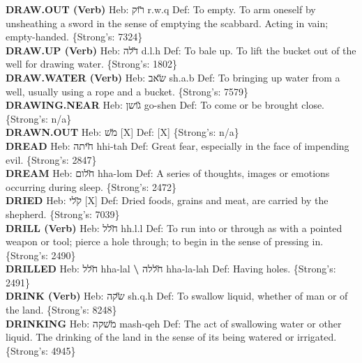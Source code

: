{\textbf{DRAW.OUT (Verb)} Heb: {\large\H רוק} r.w.q Def: To empty. To arm oneself by unsheathing a sword in the sense of emptying the scabbard. Acting in vain; empty-handed. \{Strong's: 7324\}\hfill{}\\

\textbf{DRAW.UP (Verb)} Heb: {\large\H דלה} d.l.h Def: To bale up. To lift the bucket out of the well for drawing water. \{Strong's: 1802\}\hfill{}\\

\textbf{DRAW.WATER (Verb)} Heb: {\large\H שאב} sh.a.b Def: To bringing up water from a well, usually using a rope and a bucket. \{Strong's: 7579\}\hfill{}\\

\textbf{DRAWING.NEAR} Heb: {\large\H גושן} go-shen Def: To come or be brought close. \{Strong's: n/a\}\hfill{}\\

\textbf{DRAWN.OUT} Heb: {\large\H מש} {[}X{]} Def: {[}X{]} \{Strong's: n/a\}\hfill{}\\

\textbf{DREAD} Heb: {\large\H חיתה} hhi-tah Def: Great fear, especially in the face of impending evil. \{Strong's: 2847\}\hfill{}\\

\textbf{DREAM} Heb: {\large\H חלום} hha-lom Def: A series of thoughts, images or emotions occurring during sleep. \{Strong's: 2472\}\hfill{}\\

\textbf{DRIED} Heb: {\large\H קלי} {[}X{]} Def: Dried foods, grains and meat, are carried by the shepherd. \{Strong's: 7039\}\hfill{}\\

\textbf{DRILL (Verb)} Heb: {\large\H חלל} hh.l.l Def: To run into or through as with a pointed weapon or tool; pierce a hole through; to begin in the sense of pressing in. \{Strong's: 2490\}\hfill{}\\

\textbf{DRILLED} Heb: {\large\H חלל} hha-lal \textbf{\textbackslash{}} {\large\H חללה} hha-la-lah Def: Having holes. \{Strong's: 2491\}\hfill{}\\

\textbf{DRINK (Verb)} Heb: {\large\H שקה} sh.q.h Def: To swallow liquid, whether of man or of the land. \{Strong's: 8248\}\hfill{}\\

\textbf{DRINKING} Heb: {\large\H משקה} mash-qeh Def: The act of swallowing water or other liquid. The drinking of the land in the sense of its being watered or irrigated. \{Strong's: 4945\}\hfill{}\\

}
